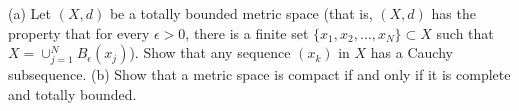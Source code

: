 (a) Let $(X,d)$ be a totally bounded metric space (that is, $(X,d)$ has the property that for every $\epsilon>0$, there is a finite set $\{x_1,x_2,\ldots,x_N\}\subset X$ such that $X=\cup_{j=1}^N B_\epsilon(x_j)$). Show that any sequence $(x_k)$ in $X$ has a Cauchy subsequence. (b) Show that a metric space is compact if and only if it is complete and totally bounded.
